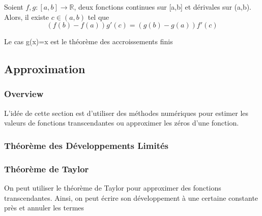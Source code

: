 \documentclass{article}
\begin{document}
\begin{lemma}
    Soient $f,g:[a,b] \to \mathbb{R}$, deux fonctions continues sur [a,b]
    et dérivales sur (a,b). Alors, il existe $c \in (a,b)$ tel que
    $$ (f(b) - f(a)) g'(c) = (g(b)-g(a))f'(c) $$
\end{lemma}

\begin{remark}
    Le cas g(x)=x est le théorème des accroissements finis
\end{remark}

\begin{remark}

\end{remark}

\subsection{Approximation}

\subsubsection*{Overview}%
\label{ssub:Overview}

L'idée de cette section est d'utiliser des méthodes numériques pour estimer
les valeurs de fonctions transcendantes ou approximer les zéros d'une
fonction.

\subsubsection{Théorème des Développements Limités}

\begin{definition}

\end{definition}

\subsubsection{Théorème de Taylor}

\begin{theorem}

\end{theorem}

\begin{problem}
    On peut utiliser le théorème de Taylor pour approximer des fonctions
    transcendantes. Ainsi, on peut écrire son développement à une certaine
    constante près et annuler les termes
\end{problem}
\end{document}
